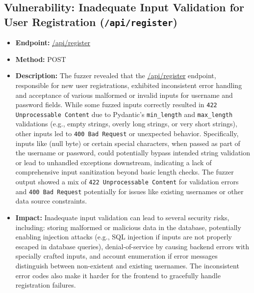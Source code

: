 \documentclass{article}
\begin{document}
\subsection{\texorpdfstring{\textbf{Vulnerability: Inadequate Input Validation for User Registration (\texttt{/api/register})}}{Vulnerability: Inadequate Input Validation for User Registration (/api/register)}}
\begin{itemize}
    \item \textbf{Endpoint:} \url{/api/register}
    \item \textbf{Method:} POST
    \item \textbf{Description:}
    The fuzzer revealed that the \url{/api/register} endpoint, responsible for new user registrations, exhibited inconsistent error handling and acceptance of various malformed or invalid inputs for username and password fields. While some fuzzed inputs correctly resulted in \texttt{422 Unprocessable Content} due to Pydantic's \texttt{min\_length} and \texttt{max\_length} validations (e.g., empty strings, overly long strings, or very short strings), other inputs led to \texttt{400 Bad Request} or unexpected behavior. Specifically, inputs like \texttt{} (null byte) or certain special characters, when passed as part of the username or password, could potentially bypass intended string validation or lead to unhandled exceptions downstream, indicating a lack of comprehensive input sanitization beyond basic length checks. The fuzzer output showed a mix of \texttt{422 Unprocessable Content} for validation errors and \texttt{400 Bad Request} potentially for issues like existing usernames or other data source constraints.
    \item \textbf{Impact:}
    Inadequate input validation can lead to several security risks, including: storing malformed or malicious data in the database, potentially enabling injection attacks (e.g., SQL injection if inputs are not properly escaped in database queries), denial-of-service by causing backend errors with specially crafted inputs, and account enumeration if error messages distinguish between non-existent and existing usernames. The inconsistent error codes also make it harder for the frontend to gracefully handle registration failures.
\end{itemize}
\end{document}
